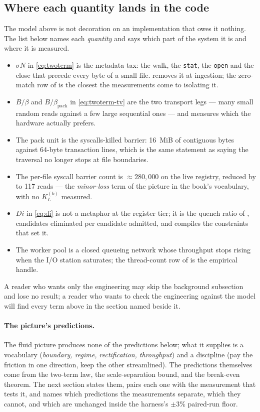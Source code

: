 \documentclass[11pt,letterpaper]{article}
\begin{document}
\subsection{Where each quantity lands in the code}
The model above is not decoration on an implementation that owes it nothing.
The list below names each \emph{quantity} and says which part of the system
it is and where it is measured.
\begin{itemize}[leftmargin=*,itemsep=1pt]
\item $\sigma N$ in \eqref{eq:twoterm} is the metadata tax: the walk, the
  \texttt{stat}, the \texttt{open} and the close that precede every byte of
  a small file.  removes it at ingestion; the zero-match
  row of  is the closest the measurements come to
  isolating it.
\item $B/\beta$ and $B/\beta_{\text{pack}}$ in \eqref{eq:twoterm-tv} are
  the two transport legs --- many small random reads against a few large
  sequential ones --- and  measures which the hardware
  actually prefers.
\item The pack unit is the syscalls-killed barrier: 16~MiB of contiguous bytes
  against 64-byte transaction lines, which is the same statement as saying the
  traversal no longer stops at file boundaries.
\item The per-file syscall barrier count is $\approx 280{,}000$ on the live
  registry, reduced by  to 117 reads --- the
  \emph{minor-loss} term of the picture in the book's vocabulary, with no
  $K_L^{(k)}$ measured.
\item $Di$ in \eqref{eq:di} is not a metaphor at the register tier; it is
  the quench ratio of , candidates eliminated per candidate
  admitted, and  compiles the constraints that set it.
\item The worker pool is a closed queueing network whose throughput stops
  rising when the I/O station saturates; the thread-count row of
   is the empirical handle.
\end{itemize}
A reader who wants only the engineering may skip the background subsection
and lose no result; a reader who wants to check the engineering against the
model will find every term above in the section named beside it.

\paragraph{The picture's predictions.}
The fluid picture produces none of the predictions below; what it supplies
is a vocabulary (\emph{boundary, regime, rectification, throughput}) and a
discipline (pay the friction in one direction, keep the other streamlined).
The predictions themselves come from the two-term law, the scale-separation
bound, and the break-even theorem. The next section states them, pairs
each one with the measurement that tests it, and names which predictions
the measurements separate, which they cannot, and which are unchanged
inside the harness's $\pm 3$\% paired-run floor.
\end{document}
